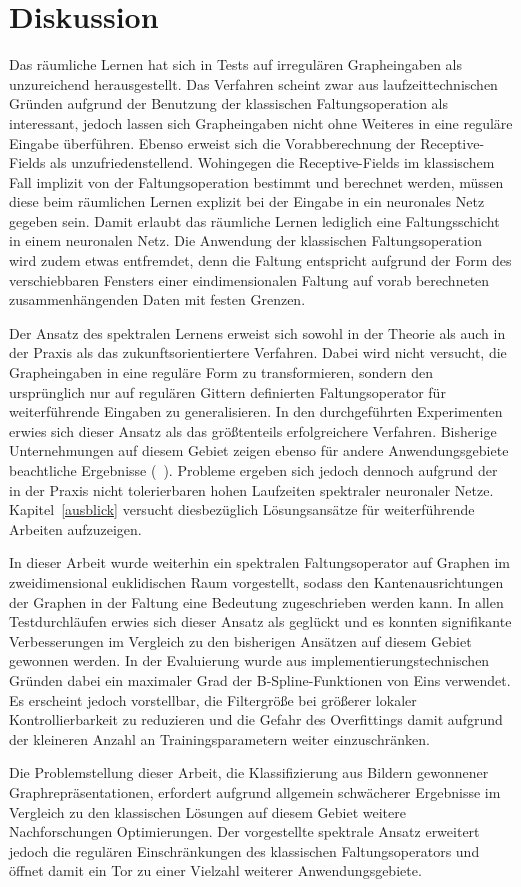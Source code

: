 \section{Diskussion}
\label{diskussion}

Das räumliche Lernen hat sich in Tests auf irregulären Grapheingaben als unzureichend herausgestellt.
Das Verfahren scheint zwar aus laufzeittechnischen Gründen aufgrund der Benutzung der klassischen Faltungsoperation als interessant, jedoch lassen sich Grapheingaben nicht ohne Weiteres in eine reguläre Eingabe überführen.
Ebenso erweist sich die Vorabberechnung der Receptive-Fields als unzufriedenstellend.
Wohingegen die Receptive-Fields im klassischem Fall implizit von der Faltungsoperation bestimmt und berechnet werden, müssen diese beim räumlichen Lernen explizit bei der Eingabe in ein neuronales Netz gegeben sein.
Damit erlaubt das räumliche Lernen lediglich eine Faltungsschicht in einem neuronalen Netz.
Die Anwendung der klassischen Faltungsoperation wird zudem etwas entfremdet, denn die Faltung entspricht aufgrund der Form des verschiebbaren Fensters einer eindimensionalen Faltung auf vorab berechneten zusammenhängenden Daten mit festen Grenzen.

Der Ansatz des spektralen Lernens erweist sich sowohl in der Theorie als auch in der Praxis als das zukunftsorientiertere Verfahren.
Dabei wird nicht versucht, die Grapheingaben in eine reguläre Form zu transformieren, sondern den ursprünglich nur auf regulären Gittern definierten Faltungsoperator für weiterführende Eingaben zu generalisieren.
In den durchgeführten Experimenten erwies sich dieser Ansatz als das größtenteils erfolgreichere Verfahren.
Bisherige Unternehmungen auf diesem Gebiet zeigen ebenso für andere Anwendungsgebiete beachtliche Ergebnisse (\vgl{}~\cite{Defferrard, gcn}).
Probleme ergeben sich jedoch dennoch aufgrund der in der Praxis nicht tolerierbaren hohen Laufzeiten spektraler neuronaler Netze.
Kapitel~\ref{ausblick} versucht diesbezüglich Lösungsansätze für weiterführende Arbeiten aufzuzeigen.

In dieser Arbeit wurde weiterhin ein spektralen Faltungsoperator auf Graphen im zweidimensional euklidischen Raum vorgestellt, sodass den Kantenausrichtungen der Graphen in der Faltung eine Bedeutung zugeschrieben werden kann.
In allen Testdurchläufen erwies sich dieser Ansatz als geglückt und es konnten signifikante Verbesserungen im Vergleich zu den bisherigen Ansätzen auf diesem Gebiet gewonnen werden.
In der Evaluierung wurde aus implementierungstechnischen Gründen dabei ein maximaler Grad der B-Spline-Funktionen von Eins verwendet.
Es erscheint jedoch vorstellbar, die Filtergröße bei größerer lokaler Kontrollierbarkeit zu reduzieren und die Gefahr des Overfittings damit aufgrund der kleineren Anzahl an Trainingsparametern weiter einzuschränken.

Die Problemstellung dieser Arbeit, die Klassifizierung aus Bildern gewonnener Graph\-re\-prä\-sen\-ta\-tio\-nen, erfordert aufgrund allgemein schwächerer Ergebnisse im Vergleich zu den klassischen Lösungen auf diesem Gebiet weitere Nachforschungen \bzw{} Optimierungen.
Der vorgestellte spektrale Ansatz erweitert jedoch die regulären Einschränkungen des klassischen Faltungsoperators und öffnet damit ein Tor zu einer Vielzahl weiterer Anwendungsgebiete.
